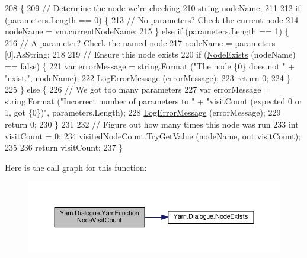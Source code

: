 \begin{DoxyCode}
208         \{
209             \textcolor{comment}{// Determine the node we're checking}
210             \textcolor{keywordtype}{string} nodeName;
211 
212             \textcolor{keywordflow}{if} (parameters.Length == 0) \{
213                 \textcolor{comment}{// No parameters? Check the current node}
214                 nodeName = vm.currentNodeName;
215             \} \textcolor{keywordflow}{else} \textcolor{keywordflow}{if} (parameters.Length == 1) \{
216                 \textcolor{comment}{// A parameter? Check the named node}
217                 nodeName = parameters [0].AsString;
218 
219                 \textcolor{comment}{// Ensure this node exists}
220                 \textcolor{keywordflow}{if} (\hyperlink{a00082_a93bb76a1f9a4058f225ff4cee97483c6}{NodeExists} (nodeName) == \textcolor{keyword}{false}) \{
221                     var errorMessage = string.Format (\textcolor{stringliteral}{"The node \{0\} does not "} + \textcolor{stringliteral}{"exist."}, nodeName);
222                     \hyperlink{a00082_a9801e83dd044d6498fdf6ebcc6bec5ac}{LogErrorMessage} (errorMessage);
223                     \textcolor{keywordflow}{return} 0;
224                 \}
225             \} \textcolor{keywordflow}{else} \{
226                 \textcolor{comment}{// We got too many parameters}
227                 var errorMessage = string.Format (\textcolor{stringliteral}{"Incorrect number of parameters to "} + \textcolor{stringliteral}{"visitCount
       (expected 0 or 1, got \{0\})"}, parameters.Length);
228                 \hyperlink{a00082_a9801e83dd044d6498fdf6ebcc6bec5ac}{LogErrorMessage} (errorMessage);
229                 \textcolor{keywordflow}{return} 0;
230             \}
231 
232             \textcolor{comment}{// Figure out how many times this node was run}
233             \textcolor{keywordtype}{int} visitCount = 0;
234             visitedNodeCount.TryGetValue (nodeName, out visitCount);
235 
236             \textcolor{keywordflow}{return} visitCount;
237         \}
\end{DoxyCode}


Here is the call graph for this function\-:
\nopagebreak
\begin{figure}[H]
\begin{center}
\leavevmode
\includegraphics[width=350pt]{a00082_a10c9f22d3f55e74f091cd6069c431094_cgraph}
\end{center}
\end{figure}




